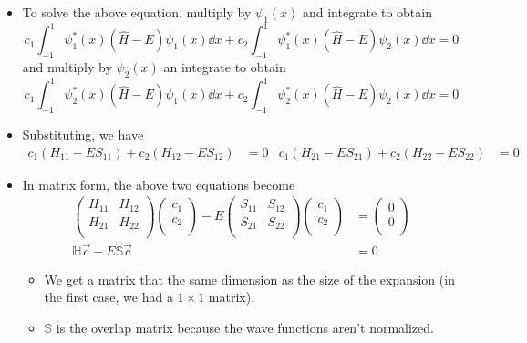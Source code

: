 \documentclass[../notes.tex]{subfiles}
\begin{document}
\begin{itemize}
\begin{itemize}
        \item To solve the above equation, multiply by $\psi_1(x)$ and integrate to obtain
        \begin{equation*}
            c_1\int_{-1}^1\psi_1^*(x)(\hat{H}-E)\psi_1(x)\dd{x}+c_2\int_{-1}^1\psi_1^*(x)(\hat{H}-E)\psi_2(x)\dd{x} = 0
        \end{equation*}
        and multiply by $\psi_2(x)$ an integrate to obtain
        \begin{equation*}
            c_1\int_{-1}^1\psi_2^*(x)(\hat{H}-E)\psi_1(x)\dd{x}+c_2\int_{-1}^1\psi_2^*(x)(\hat{H}-E)\psi_2(x)\dd{x} = 0
        \end{equation*}
        \item Substituting, we have
        \begin{align*}
            c_1(H_{11}-ES_{11})+c_2(H_{12}-ES_{12}) &= 0&
            c_1(H_{21}-ES_{21})+c_2(H_{22}-ES_{22}) &= 0
        \end{align*}
        \item In matrix form, the above two equations become
        \begin{align*}
            \begin{pmatrix}
                H_{11} & H_{12}\\
                H_{21} & H_{22}\\
            \end{pmatrix}
            \begin{pmatrix}
                c_1\\
                c_2\\
            \end{pmatrix}
            -E
            \begin{pmatrix}
                S_{11} & S_{12}\\
                S_{21} & S_{22}\\
            \end{pmatrix}
            \begin{pmatrix}
                c_1\\
                c_2\\
            \end{pmatrix}
            &=
            \begin{pmatrix}
                0\\
                0\\
            \end{pmatrix}\\
            \mathbb{H}\vec{c}-E\mathbb{S}\vec{c} &= 0
        \end{align*}
        \begin{itemize}
            \item We get a matrix that the same dimension as the size of the expansion (in the first case, we had a $1\times 1$ matrix).
            \item $\mathbb{S}$ is the overlap matrix because the wave functions aren't normalized.
        \end{itemize}
    \end{itemize}
\end{itemize}
\end{document}
